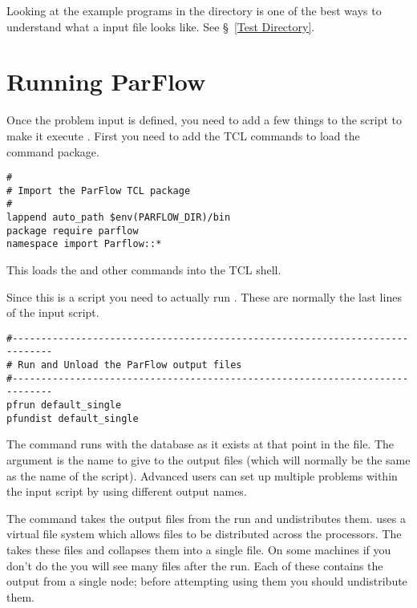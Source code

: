 Looking at the example programs in the  directory is one of
the best ways to understand what a \parflow{} input file looks like. See
\S~\ref{Test Directory}.  


\section{Running ParFlow}
\label{Running ParFlow}

Once the problem input is defined, you need to add a few things to 
the script to make it execute \parflow{}.  First you need to add
the TCL commands to load the \parflow{} command package.

\begin{display}\begin{verbatim}
#
# Import the ParFlow TCL package
#
lappend auto_path $env(PARFLOW_DIR)/bin 
package require parflow
namespace import Parflow::*
\end{verbatim}\end{display}

This loads the  and other \parflow{} commands into the
TCL shell.

Since this is a script you need to actually run \parflow{}. These are
normally the last lines of the input script.

\begin{display}\begin{verbatim}
#-----------------------------------------------------------------------------
# Run and Unload the ParFlow output files
#-----------------------------------------------------------------------------
pfrun default_single
pfundist default_single
\end{verbatim}\end{display}


The  command runs \parflow{} with the database as it
exists at that point in the file.  The argument is the name to give to
the output files (which will normally be the same as the name of the
script).  Advanced users can set up multiple problems within the input
script by using different output names.  

The  command takes the output files from the \parflow{}
run and undistributes them.  \parflow{} uses a virtual file system
which allows files to be distributed across the processors.  The
 takes these files and collapses them into a single
file.  On some machines if you don't do the  you will
see many files after the run.  Each of these contains the output from
a single node; before attempting using them you should undistribute them.

